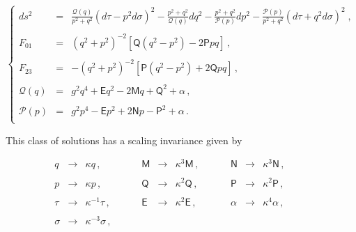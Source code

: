 \documentclass[12pt,a4paper]{article}
\begin{document}
\begin{equation}
\label{eq:D&P2metric}
\left\{
\begin{array}{rcl}
ds^{2} & = &  {\displaystyle\frac{\mathcal{Q}(q)}{p^{2}+q^{2}}
              \left( d\tau -p^{2}d\sigma \right)^{2}
            -\frac{p^{2}+q^{2}}{\mathcal{Q}(q)} dq^{2}
            -\frac{p^{2}+q^{2}}{\mathcal{P}(p)} dp^{2}
            -\frac{\mathcal{P}(p)}{p^{2}+q^{2}}
              \left( d\tau +q^{2}d\sigma \right)^{2}} \; ,\\
& & \\
F_{01} & = & (q^{2}+p^{2})^{-2}
\left[\mathsf{Q}(q^{2}-p^{2})-2\mathsf{P}pq\right] \, ,  \\  
& & \\
F_{23} &=& -(q^{2}+p^{2})^{-2}
\left[\mathsf{P}(q^{2}-p^{2})+2\mathsf{Q}pq\right] \, , \\
& & \\
\mathcal{Q}(q) & = & g^{2}q^{4}+\mathsf{E}q^{2}-2\mathsf{M}q
                   +\mathsf{Q}^{2}+\alpha \, , \\
& & \\
\mathcal{P}(p) & = & g^{2}p^{4}-\mathsf{E}p^{2}+2\mathsf{N}p
                   -\mathsf{P}^{2}+\alpha \, .\\
\end{array}
\right.
\end{equation}

This class of solutions has a scaling invariance given by

\begin{equation}
\begin{array}{rclrclrcl}
q          & \rightarrow & \kappa q\, ,              &
\mathsf{M} & \rightarrow & \kappa^{3}\mathsf{M}\, ,\hspace{1cm}  & 
\mathsf{N} & \rightarrow & \kappa^{3}\mathsf{N}\, ,  \\
& & & & & & & & \\
p          & \rightarrow & \kappa p\, ,              & 
\mathsf{Q} & \rightarrow & \kappa^{2}\mathsf{Q}\, ,  & 
\mathsf{P} & \rightarrow & \kappa^{2}\mathsf{P}\, ,\hspace{1cm}  \\
& & & & & & & & \\
\tau       & \rightarrow & \kappa^{-1}\tau\, ,\hspace{1cm}       & 
\mathsf{E} & \rightarrow & \kappa^{2}\mathsf{E}\, ,  &
\alpha     & \rightarrow & \kappa^{4}\alpha\, ,      \\
& & & & & & & & \\
\sigma     & \rightarrow & \kappa^{-3} \sigma\, ,    & 
& & & & & \\
\end{array}
\label{eq:PDscaling}
\end{equation}
\end{document}

